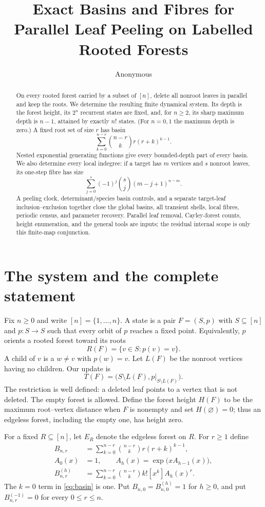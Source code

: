 \documentclass[10pt,a4paper]{amsart}
\title[Rooted-forest leaf peeling]{Exact Basins and Fibres for Parallel Leaf Peeling on Labelled Rooted Forests}
\author{Anonymous}
\date{}
\theoremstyle{definition}
\begin{document}
\begin{abstract}
On every rooted forest carried by a subset of $[n]$, delete all nonroot
leaves in parallel and keep the roots.  We determine the resulting finite
dynamical system.  Its depth is the forest height, its $2^n$ recurrent states
are fixed, and, for $n\geq2$, its sharp maximum depth is $n-1$, attained by
exactly $n!$ states.  (For $n=0,1$ the maximum depth is zero.)  A fixed root
set of size $r$ has basin
\[
 \sum_{k=0}^{n-r}\binom{n-r}{k}r(r+k)^{k-1}.
\]
Nested exponential generating functions give every bounded-depth part of
every basin.  We also determine every local indegree: if a target has $m$
vertices and $s$ nonroot leaves, its one-step fibre has size
\[
 \sum_{j=0}^{s}(-1)^j\binom{s}{j}(m-j+1)^{n-m}.
\]
A peeling clock, determinant/species basin controls, and a separate
target-leaf inclusion--exclusion together close the global basins, all
transient shells, local fibres, periodic census, and parameter recovery.
Parallel leaf removal, Cayley-forest counts, height enumeration, and the
general tools are inputs; the residual internal scope is only this finite-map
conjunction.
\end{abstract}

\maketitle

\section{The system and the complete statement}

Fix $n\geq0$ and write $[n]=\{1,\ldots,n\}$.  A state is a pair
$F=(S,p)$ with $S\subseteq[n]$ and $p:S\to S$ such that every orbit of $p$
reaches a fixed point.  Equivalently, $p$ orients a rooted forest toward its
roots
\[
 R(F)=\{v\in S:p(v)=v\}.
\]
A child of $v$ is a $w\ne v$ with $p(w)=v$.  Let $L(F)$ be the nonroot
vertices having no children.  Our update is
\[
 T(F)=\bigl(S\setminus L(F),p|_{S\setminus L(F)}\bigr).       \tag{1.1}
\]
The restriction is well defined: a deleted leaf points to a vertex that is
not deleted.  The empty forest is allowed.  Define the forest height
$H(F)$ to be the maximum root--vertex distance when $F$ is nonempty and set
$H(\varnothing)=0$; thus an edgeless forest, including the empty one, has
height zero.

For a fixed $R\subseteq[n]$, let $E_R$ denote the edgeless forest on $R$.
For $r\geq1$ define
\begin{align}
 B_{n,r}&=\sum_{k=0}^{n-r}\binom{n-r}{k}r(r+k)^{k-1},          \tag{1.2}\label{eq:basin}\\
 A_0(x)&=1,\qquad A_h(x)=\exp\!\bigl(xA_{h-1}(x)\bigr),       \tag{1.3}\label{eq:Ah}\\
 B_{n,r}^{(h)}
 &=\sum_{k=0}^{n-r}\binom{n-r}{k}k![x^k]A_h(x)^r.            \tag{1.4}\label{eq:bounded-basin}
\end{align}
The $k=0$ term in \eqref{eq:basin} is one.  Put $B_{n,0}=B_{n,0}^{(h)}=1$
for $h\geq0$, and put $B_{n,r}^{(-1)}=0$ for every $0\leq r\leq n$.
\end{document}
